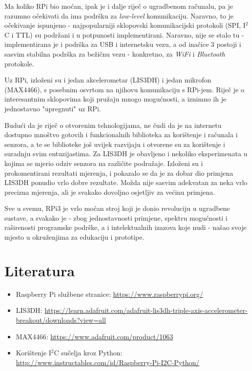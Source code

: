 \documentclass[12pt,a4paper]{article}
\begin{document}
	\par Ma koliko RPi bio moćan, ipak je i dalje riječ o ugradbenom računalu, pa je razumno očekivati da ima podršku za \textit{low-level} komunikaciju. Naravno, to je očekivanje ispunjeno - najpopularniji sklopovski komunikacijski protokoli (SPI, I$^2$C i TTL) su podržani i u potpunosti implementirani. Naravno, nije se stalo tu - implementirana je i podrška za USB i internetsku vezu, a od inačice 3 postoji i sasvim stabilna podrška za bežičnu vezu - konkretno, za \textit{WiFi} i \textit{Bluetooth} protokole. \\

	\par Uz RPi, izloženi su i jedan akcelerometar (LIS3DH) i jedan mikrofon (MAX4466), s posebnim osvrtom na njihovu komunikaciju s RPi-jem. Riječ je o interesantnim sklopovima koji pružaju mnogo mogućnosti, a iznimno ih je jednostavno "upregnuti" uz RPi. \\

	\par Budući da je riječ o otvorenim tehnologijama, ne čudi da je na internetu dostupno mnoštvo gotovih i funkcionalnih biblioteka za korištenje i računala i senzora, a te se biblioteke još uvijek razvijaju i otvorene su za korištenje i suradnju svim entuzijastima. Za LIS3DH je obavljeno i nekoliko eksperimenata u kojima se mjerio odziv senzora na različite podražaje. Izloženi su i prokomentirani rezultati mjerenja, i pokazalo se da je za dobar dio primjena LIS3DH ponudio vrlo dobre rezultate. Možda nije sasvim adekvatan za neka vrlo precizna mjerenja, ali je svakako dovoljno osjetljiv za većinu primjena. \\

	\par Sve u svemu, RPi3 je vrlo moćan stroj koji je donio revoluciju u ugradbene sustave, a svakako je - zbog jednostavnosti primjene, spektru mogućnosti i raširenosti programske podrške, a i intelektualnih izazova koje nudi - našao svoje mjesto u okruženjima za edukaciju i prototipe.


\newpage
\section{Literatura}

\begin{itemize}
	\item Raspberry Pi službene stranice: \url{https://www.raspberrypi.org/}
	\item LIS3DH: \url{https://learn.adafruit.com/adafruit-lis3dh-triple-axis-accelerometer-breakout/downloads?view=all}
	\item MAX4466: \url{https://www.adafruit.com/product/1063}
	\item Korištenje I$^2$C sučelja kroz Python: \url{http://www.instructables.com/id/Raspberry-Pi-I2C-Python/}
\end{itemize}
\end{document}
